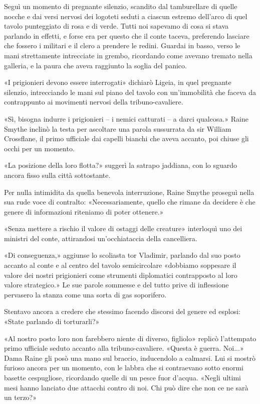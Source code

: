 Seguì un momento di pregnante silenzio, scandito dal tamburellare di
quelle nocche e dai versi nervosi dei logoteti seduti a ciascun estremo
dell'arco di quel tavolo punteggiato di rosa e di verde. Tutti noi
sapevamo di cosa si stava parlando in effetti, e forse era per questo
che il conte taceva, preferendo lasciare che fossero i militari e il
clero a prendere le redini. Guardai in basso, verso le mani strettamente
intrecciate in grembo, ricordando come avevano tremato nella galleria, e
la paura che aveva raggiunto la soglia del panico.

«I prigionieri devono essere interrogati» dichiarò Ligeia, in quel
pregnante silenzio, intrecciando le mani sul piano del tavolo con
un'immobilità che faceva da contrappunto ai movimenti nervosi della
tribuno-cavaliere.

«Sì, bisogna indurre i prigionieri -- i nemici catturati -- a darci
qualcosa.» Raine Smythe inclinò la testa per ascoltare una parola
sussurrata da sir William Crossflane, il primo ufficiale dai capelli
bianchi che aveva accanto, poi chiuse gli occhi per un momento.

«La posizione della loro flotta?» suggerì la satrapo jaddiana, con lo
sguardo ancora fisso sulla città sottostante.

Per nulla intimidita da quella benevola interruzione, Raine Smythe
proseguì nella sua rude voce di contralto: «Necessariamente, quello che
rimane da decidere è che genere di informazioni riteniamo di poter
ottenere.»

«Senza mettere a rischio il valore di ostaggi delle creature» interloquì
uno dei ministri del conte, attirandosi un'occhiataccia della
cancelliera.

«Di conseguenza,» aggiunse lo scoliasta tor Vladimir, parlando dal suo
posto accanto al conte e al centro del tavolo semicircolare «dobbiamo
soppesare il valore dei nostri prigionieri come strumenti diplomatici
contrapposto al loro valore strategico.» Le sue parole sommesse e del
tutto prive di inflessione pervasero la stanza come una sorta di gas
soporifero.

Stentavo ancora a credere che stessimo facendo discorsi del genere ed
esplosi: «State parlando di torturarli?»

«Al nostro posto loro non farebbero niente di diverso, figliolo» replicò
l'attempato primo ufficiale seduto accanto alla tribuno-cavaliere.
«Questa è guerra. Noi...» Dama Raine gli posò una mano sul braccio,
inducendolo a calmarsi. Lui si mostrò furioso ancora per un momento, con
le labbra che si contraevano sotto enormi basette cespugliose,
ricordando quelle di un pesce fuor d'acqua. «Negli ultimi mesi hanno
lanciato due attacchi contro di noi. Chi può dire che non ce ne sarà un
terzo?»

